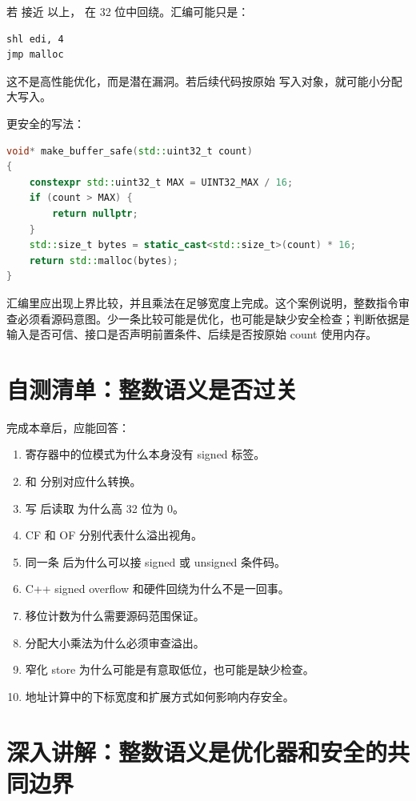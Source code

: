 若  接近  以上， 在 32 位中回绕。汇编可能只是：

\begin{lstlisting}
shl edi, 4
jmp malloc
\end{lstlisting}

这不是高性能优化，而是潜在漏洞。若后续代码按原始  写入对象，就可能小分配大写入。

更安全的写法：

\begin{lstlisting}[language=C++]
void* make_buffer_safe(std::uint32_t count)
{
    constexpr std::uint32_t MAX = UINT32_MAX / 16;
    if (count > MAX) {
        return nullptr;
    }
    std::size_t bytes = static_cast<std::size_t>(count) * 16;
    return std::malloc(bytes);
}
\end{lstlisting}

汇编里应出现上界比较，并且乘法在足够宽度上完成。这个案例说明，整数指令审查必须看源码意图。少一条比较可能是优化，也可能是缺少安全检查；判断依据是输入是否可信、接口是否声明前置条件、后续是否按原始 count 使用内存。

\section{自测清单：整数语义是否过关}

完成本章后，应能回答：

\begin{enumerate}
  \item 寄存器中的位模式为什么本身没有 signed 标签。
  \item {} 和  分别对应什么转换。
  \item 写  后读取  为什么高 32 位为 0。
  \item CF 和 OF 分别代表什么溢出视角。
  \item 同一条  后为什么可以接 signed 或 unsigned 条件码。
  \item C++ signed overflow 和硬件回绕为什么不是一回事。
  \item 移位计数为什么需要源码范围保证。
  \item 分配大小乘法为什么必须审查溢出。
  \item 窄化 store 为什么可能是有意取低位，也可能是缺少检查。
  \item 地址计算中的下标宽度和扩展方式如何影响内存安全。
\end{enumerate}

\section{深入讲解：整数语义是优化器和安全的共同边界}

